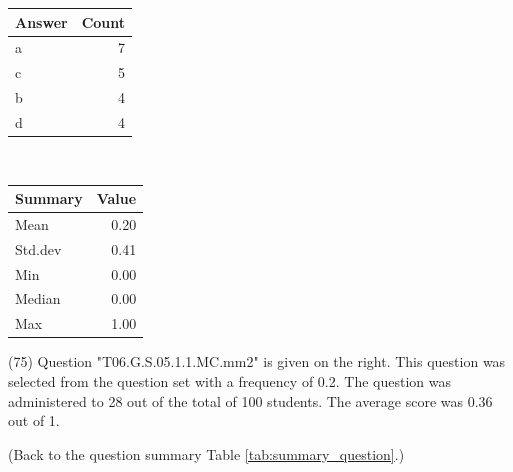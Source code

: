 \documentclass[12pt,nohyper]{tufte-handout}\usepackage[]{graphicx}\usepackage[]{color}
\begin{document}
\begin{center}%
\begin{tabular}{lr}
  \hline
Answer & Count \\ 
  \hline
a &   7 \\ 
  c &   5 \\ 
  b &   4 \\ 
  d &   4 \\ 
   \hline
\end{tabular}
~~~~~~~~%
\begin{tabular}{lr}
  \hline
Summary & Value \\ 
  \hline
Mean & 0.20 \\ 
  Std.dev & 0.41 \\ 
  Min & 0.00 \\ 
  Median & 0.00 \\ 
  Max & 1.00 \\ 
   \hline
\end{tabular}
\end{center}\newpage{} (75) Question "T06.G.S.05.1.1.MC.mm2" is given on the right. This question was selected from the question set with a frequency of 0.2. The question was administered to 28 out of the total of 100 students. The average score was 0.36 out of 1.

 (Back to the question summary Table \ref{tab:summary_question}.)
\end{document}
